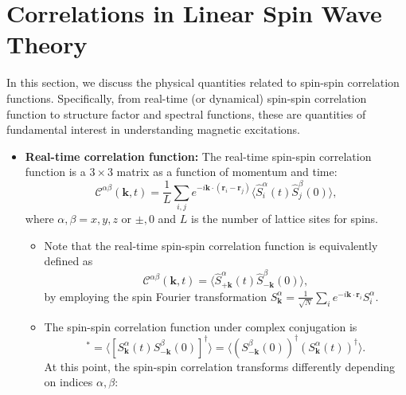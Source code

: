 \section{Correlations in Linear Spin Wave Theory}

In this section, we discuss the physical quantities related to spin-spin correlation functions. Specifically, from real-time (or dynamical) spin-spin correlation function to structure factor and spectral functions, these are quantities of fundamental interest in understanding magnetic excitations.

\begin{itemize}
    \item \textbf{Real-time correlation function:}
    The real-time spin-spin correlation function is a $3 \times 3$ matrix as a function of momentum and time:
    \begin{equation}
        \mathcal{C}^{\alpha\beta} (\mathbf{k}, t) = \frac{1}{L} \sum_{i, j} e^{- i \mathbf{k} \cdot (\mathbf{r}_{i} - \mathbf{r}_{j})} \langle \hat{S}_{i}^{\alpha}(t) \hat{S}_{j}^{\beta}(0) \rangle,
    \end{equation}
    where $\alpha, \beta = x, y, z$ or $\pm, 0$ and $L$ is the number of lattice sites for spins. 

    \begin{itemize}
        \item Note that the real-time spin-spin correlation function is equivalently defined as 
        \begin{equation}
            \mathcal{C}^{\alpha\beta} (\mathbf{k}, t) 
            = \big\langle \hat{S}_{+ \mathbf{k}}^{\alpha}(t) \hat{S}_{- \mathbf{k}}^{\beta}(0) \big\rangle,  
        \end{equation}
        by employing the spin Fourier transformation $S_{\mathbf{k}}^{\alpha} = \frac{1}{\sqrt{N}} \sum_{i} e^{-i \mathbf{k} \cdot \mathbf{r}_{i}} S_{i}^{\alpha}$.
        
        \item The spin-spin correlation function under complex conjugation is 
        \begin{equation}
            [\mathcal{C}^{\alpha\beta}(\mathbf{k}, t)]^{*}
            = \langle [S_{\mathbf{k}}^{\alpha} ( t ) S_{-\mathbf{k}}^{\beta} ( 0 )]^{\dagger} \rangle
            = \langle (S_{-\mathbf{k}}^{\beta} ( 0 ))^{\dagger} (S_{\mathbf{k}}^{\alpha} ( t ))^{\dagger} \rangle.
        \end{equation}
        At this point, the spin-spin correlation transforms differently depending on indices $\alpha, \beta$:
        

\end{itemize}
\end{itemize}
